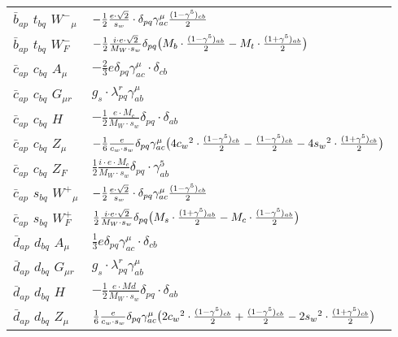 \begin{center}
\begin{tabular}{|l|l|}
$\bar{b}{}_{a p }$ \phantom{-} $t{}_{b q }$ \phantom{-} $W^-{}_{\mu }$ \phantom{-}  &
	$-\frac{1}{2}\frac{ e \cdot\sqrt{2}}{ s_w}\cdot \delta_{p q} \gamma_{a c}^\mu {(1-\gamma^5)_{c b}\over 2} $\\[2mm]
$\bar{b}{}_{a p }$ \phantom{-} $t{}_{b q }$ \phantom{-} $W^-_F{}_{}$ \phantom{-}  &
	$-\frac{1}{2}\frac{ i \cdot e \cdot\sqrt{2}}{ M_W \cdot s_w}\delta_{p q} \big( M_b\cdot {(1-\gamma^5)_{a b}\over 2} - M_t\cdot {(1+\gamma^5)_{a b}\over 2} \big)$\\[2mm]
$\bar{c}{}_{a p }$ \phantom{-} $c{}_{b q }$ \phantom{-} ${A}_{\mu }$ \phantom{-}  &
	$-\frac{2}{3} e\delta_{p q} \gamma_{a c}^\mu \cdot \delta_{c b} $\\[2mm]
$\bar{c}{}_{a p }$ \phantom{-} $c{}_{b q }$ \phantom{-} ${G}_{\mu r }$ \phantom{-}  &
	$ g_s\cdot \lambda_{p q}^r \gamma_{a b}^\mu $\\[2mm]
$\bar{c}{}_{a p }$ \phantom{-} $c{}_{b q }$ \phantom{-} ${H}_{}$ \phantom{-}  &
	$-\frac{1}{2}\frac{ e \cdot M_c}{ M_W \cdot s_w}\delta_{p q} \cdot \delta_{a b} $\\[2mm]
$\bar{c}{}_{a p }$ \phantom{-} $c{}_{b q }$ \phantom{-} ${Z}_{\mu }$ \phantom{-}  &
	$-\frac{1}{6}\frac{ e}{ c_w \cdot s_w}\delta_{p q} \gamma_{a c}^\mu \big(4 c_w{}^2 \cdot {(1-\gamma^5)_{c b}\over 2} -{(1-\gamma^5)_{c b}\over 2} -4 s_w{}^2 \cdot {(1+\gamma^5)_{c b}\over 2} \big)$\\[2mm]
$\bar{c}{}_{a p }$ \phantom{-} $c{}_{b q }$ \phantom{-} $Z_F{}_{}$ \phantom{-}  &
	$\frac{1}{2}\frac{ i \cdot e \cdot M_c}{ M_W \cdot s_w}\delta_{p q} \cdot \gamma_{a b}^5 $\\[2mm]
$\bar{c}{}_{a p }$ \phantom{-} $s{}_{b q }$ \phantom{-} $W^+{}_{\mu }$ \phantom{-}  &
	$-\frac{1}{2}\frac{ e \cdot\sqrt{2}}{ s_w}\cdot \delta_{p q} \gamma_{a c}^\mu {(1-\gamma^5)_{c b}\over 2} $\\[2mm]
$\bar{c}{}_{a p }$ \phantom{-} $s{}_{b q }$ \phantom{-} $W^+_F{}_{}$ \phantom{-}  &
	$\frac{1}{2}\frac{ i \cdot e \cdot\sqrt{2}}{ M_W \cdot s_w}\delta_{p q} \big( M_s\cdot {(1+\gamma^5)_{a b}\over 2} - M_c\cdot {(1-\gamma^5)_{a b}\over 2} \big)$\\[2mm]
$\bar{d}{}_{a p }$ \phantom{-} $d{}_{b q }$ \phantom{-} ${A}_{\mu }$ \phantom{-}  &
	$\frac{1}{3} e\delta_{p q} \gamma_{a c}^\mu \cdot \delta_{c b} $\\[2mm]
$\bar{d}{}_{a p }$ \phantom{-} $d{}_{b q }$ \phantom{-} ${G}_{\mu r }$ \phantom{-}  &
	$ g_s\cdot \lambda_{p q}^r \gamma_{a b}^\mu $\\[2mm]
$\bar{d}{}_{a p }$ \phantom{-} $d{}_{b q }$ \phantom{-} ${H}_{}$ \phantom{-}  &
	$-\frac{1}{2}\frac{ e \cdot Md}{ M_W \cdot s_w}\delta_{p q} \cdot \delta_{a b} $\\[2mm]
$\bar{d}{}_{a p }$ \phantom{-} $d{}_{b q }$ \phantom{-} ${Z}_{\mu }$ \phantom{-}  &
	$\frac{1}{6}\frac{ e}{ c_w \cdot s_w}\delta_{p q} \gamma_{a c}^\mu \big(2 c_w{}^2 \cdot {(1-\gamma^5)_{c b}\over 2} +{(1-\gamma^5)_{c b}\over 2} -2 s_w{}^2 \cdot {(1+\gamma^5)_{c b}\over 2} \big)$\\ \hline
\end{tabular}


\end{center}
